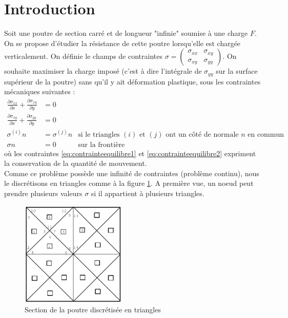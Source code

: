 \section*{Introduction}
Soit une poutre de section carré et de longueur "infinie" soumise à une charge $F$. On se propose d'étudier la résistance de cette poutre lorsqu'elle est chargée verticalement. On définie le champs de contraintes $\sigma = \begin{pmatrix}
\sigma_{xx} & \sigma_{xy}\\
\sigma_{xy} & \sigma_{yy}
\end{pmatrix}$. On souhaite maximiser la charge imposé (c'est à dire l'intégrale de $\sigma_{yy}$ sur la surface supérieur de la poutre) sans qu'il y ait déformation plastique, sous les contraintes mécaniques suivantes : 
\begin{align}
\frac{\partial \sigma_{xx}}{\partial x} + \frac{\partial \sigma_{xy}}{\partial y} &= 0 \label{eq:contrainteequilibre1}\\
\frac{\partial \sigma_{xy}}{\partial x} + \frac{\partial \sigma_{yy}}{\partial y} &= 0\label{eq:contrainteequilibre2}\\
\sigma^{(i)}n &= \sigma^{(j)}n & \text{si le triangles $(i)$ et $(j)$ ont un côté de normale $n$ en commun} \label{eq:contrainteContinuite}\\
\sigma n &= 0 & \text{sur la frontière} \label{eq:contrainteFrontiere}
\end{align}
où les contraintes \eqref{eq:contrainteequilibre1} et \eqref{eq:contrainteequilibre2} expriment la conservation de la quantité de mouvement. \\
Comme ce problème possède une infinité de contraintes (problème continu), nous le discrétisons en triangles comme à la figure \ref{fig:discretisation}. A première vue, un noeud peut prendre plusieurs valeurs $\sigma$ si il appartient à plusieurs triangles. 

\begin{figure}
\centering
\includegraphics[height=5cm]{images/discretisation.png}
\caption{Section de la poutre discrétisée en triangles}
\label{fig:discretisation}
\end{figure}


